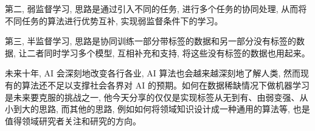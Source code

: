 第二, 弱监督学习, 思路是通过引入不同的任务, 进行多个任务的协同处理, 从而将不同任务的算法进行优势互补, 实现弱监督条件下的学习。

第三, 半监督学习, 思路是协同训练一部分带标签的数据和另一部分没有标签的数据, 让二者同时学习多个模型, 互相补充和支持, 将这些没有标签的数据也用起来。

未来十年, AI 会深刻地改变各行各业, AI 算法也会越来越深刻地了解人类, 然而现有的算法还不足以支撑社会各界对 AI 的预期。如何在数据稀缺情况下做机器学习是未来要克服的挑战之一, 他今天分享的仅仅是实现标签从无到有、由弱变强、从小到大的思路, 而其他的思路, 例如如何将领域知识设计成一种通用的算法等, 也是值得领域研究者关注和研究的方向。